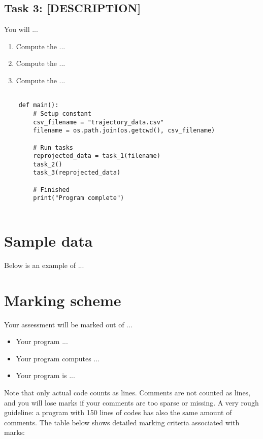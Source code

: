 \documentclass[10pt,a4paper]{article}
\begin{document}
\subsection{Task 3: [DESCRIPTION]}

You will ...
\begin{enumerate}
\item{Compute the ...}
\item{Compute the ...}
\item{Compute the ...}
\end{enumerate}

\begin{lstlisting}

	def main():
	    # Setup constant
	    csv_filename = "trajectory_data.csv"
	    filename = os.path.join(os.getcwd(), csv_filename)
		
	    # Run tasks
	    reprojected_data = task_1(filename)
	    task_2()
	    task_3(reprojected_data)
		
	    # Finished
	    print("Program complete")
		
\end{lstlisting}

\section{Sample data}
\label{sec:sample_output}

Below is an example of ...

\section{Marking scheme}


Your assessment will be marked out of ...
\begin{itemize}
\item{Your program ...}
\item{Your program computes ...}
\item{Your program is ...}
\end{itemize}

Note that only actual code counts as lines. Comments are not counted as lines, and you will lose marks if your comments are too sparse or missing. A very rough guideline: a program with 150 lines of codes has also the same amount of comments. 
The table below shows detailed marking criteria associated with marks:\\
\end{document}
